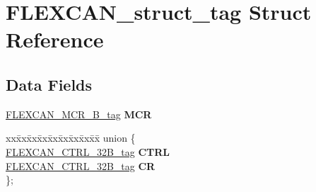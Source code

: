 \hypertarget{structFLEXCAN__struct__tag}{}\section{F\+L\+E\+X\+C\+A\+N\+\_\+struct\+\_\+tag Struct Reference}
\label{structFLEXCAN__struct__tag}
\subsection*{Data Fields}
\begin{DoxyCompactItemize}
\item 
\mbox{\label{structFLEXCAN__struct__tag_a2d90299484cd34f53d0286a282228b1f}} 
\mbox{\hyperlink{unionFLEXCAN__MCR__32B__tag}{F\+L\+E\+X\+C\+A\+N\+\_\+\+M\+C\+R\+\_\+B\+\_\+tag}} {\bfseries M\+CR}
\item 
\mbox{\label{structFLEXCAN__struct__tag_ab186126afb65e0320d67ebc58f1409a3}} 
\begin{tabbing}
xx\=xx\=xx\=xx\=xx\=xx\=xx\=xx\=xx\=\kill
union \{\\
\>\mbox{\hyperlink{unionFLEXCAN__CTRL__32B__tag}{FLEXCAN\_CTRL\_32B\_tag}} {\bfseries CTRL}\\
\>\mbox{\hyperlink{unionFLEXCAN__CTRL__32B__tag}{FLEXCAN\_CTRL\_32B\_tag}} {\bfseries CR}\\
\}; \\


\end{tabbing}
\end{DoxyCompactItemize}
